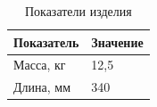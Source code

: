 \begin{longtable}{ll} %
  \caption{Показатели изделия} \\
  \hline
  Показатель & Значение \\
  \hline
  \endhead
  Масса, кг & 12,5 \\
  Длина, мм & 340 \\
  \hline
\end{longtable}
